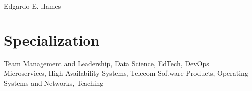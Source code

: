 \documentclass[10pt]{article}
\begin{document}
\color{text1} %




\begin{minipage}[t]{0.48\textwidth} %
\vspace{0pt} %


{\sffamily\Huge Edgardo E. Hames}

\section{Specialization}
Team Management and Leadership, Data Science, EdTech, DevOps, Microservices,
High Availability Systems, Telecom Software Products, 
Operating Systems and Networks, Teaching\\[10pt]



\end{minipage}
\end{document}
